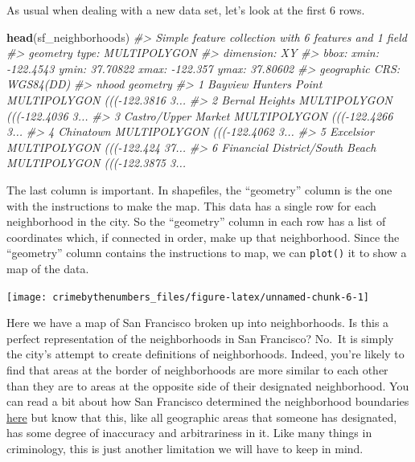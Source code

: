\documentclass[
  12pt,
]{book}
\newenvironment{Shaded}{\begin{snugshade}}{\end{snugshade}}
\newcommand{\CommentTok}[1]{\textcolor[rgb]{0.37,0.37,0.37}{\textit{#1}}}
\newcommand{\KeywordTok}[1]{\textcolor[rgb]{0.27,0.27,0.27}{\textbf{#1}}}
\newcommand{\NormalTok}[1]{#1}
\newcommand{\OperatorTok}[1]{\textcolor[rgb]{0.43,0.43,0.43}{\textbf{#1}}}
\begin{document}
As usual when dealing with a new data set, let's look at the first 6 rows.

\begin{Shaded}
\begin{Highlighting}[]
\KeywordTok{head}\NormalTok{(sf\_neighborhoods)}
\CommentTok{\#\textgreater{} Simple feature collection with 6 features and 1 field}
\CommentTok{\#\textgreater{} geometry type:  MULTIPOLYGON}
\CommentTok{\#\textgreater{} dimension:      XY}
\CommentTok{\#\textgreater{} bbox:           xmin: {-}122.4543 ymin: 37.70822 xmax: {-}122.357 ymax: 37.80602}
\CommentTok{\#\textgreater{} geographic CRS: WGS84(DD)}
\CommentTok{\#\textgreater{}                            nhood                       geometry}
\CommentTok{\#\textgreater{} 1          Bayview Hunters Point MULTIPOLYGON ((({-}122.3816 3...}
\CommentTok{\#\textgreater{} 2                 Bernal Heights MULTIPOLYGON ((({-}122.4036 3...}
\CommentTok{\#\textgreater{} 3            Castro/Upper Market MULTIPOLYGON ((({-}122.4266 3...}
\CommentTok{\#\textgreater{} 4                      Chinatown MULTIPOLYGON ((({-}122.4062 3...}
\CommentTok{\#\textgreater{} 5                      Excelsior MULTIPOLYGON ((({-}122.424 37...}
\CommentTok{\#\textgreater{} 6 Financial District/South Beach MULTIPOLYGON ((({-}122.3875 3...}
\end{Highlighting}
\end{Shaded}

The last column is important. In shapefiles, the ``geometry'' column is the one with the instructions to make the map. This data has a single row for each neighborhood in the city. So the ``geometry'' column in each row has a list of coordinates which, if connected in order, make up that neighborhood. Since the ``geometry'' column contains the instructions to map, we can \texttt{plot()} it to show a map of the data.

\begin{Shaded}
\end{Shaded}

\begin{center}\texttt{[image: crimebythenumbers\_files/figure-latex/unnamed-chunk-6-1]} \end{center}

Here we have a map of San Francisco broken up into neighborhoods. Is this a perfect representation of the neighborhoods in San Francisco? No.~It is simply the city's attempt to create definitions of neighborhoods. Indeed, you're likely to find that areas at the border of neighborhoods are more similar to each other than they are to areas at the opposite side of their designated neighborhood. You can read a bit about how San Francisco determined the neighborhood boundaries \href{https://data.sfgov.org/Geographic-Locations-and-Boundaries/Analysis-Neighborhoods/p5b7-5n3h}{here} but know that this, like all geographic areas that someone has designated, has some degree of inaccuracy and arbitrariness in it. Like many things in criminology, this is just another limitation we will have to keep in mind.
\end{document}
